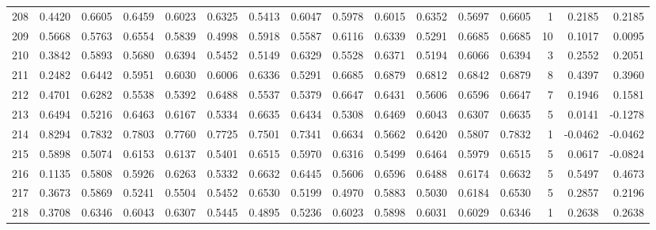 \begin{tabular}{lrrrrrrrrrrrrrrr}
208 &      0.4420 &  0.6605 &  0.6459 &  0.6023 &  0.6325 &  0.5413 &  0.6047 &  0.5978 &  0.6015 &  0.6352 &   0.5697 &     0.6605 &      1 &                    0.2185 &                     0.2185 \\
209 &      0.5668 &  0.5763 &  0.6554 &  0.5839 &  0.4998 &  0.5918 &  0.5587 &  0.6116 &  0.6339 &  0.5291 &   0.6685 &     0.6685 &     10 &                    0.1017 &                     0.0095 \\
210 &      0.3842 &  0.5893 &  0.5680 &  0.6394 &  0.5452 &  0.5149 &  0.6329 &  0.5528 &  0.6371 &  0.5194 &   0.6066 &     0.6394 &      3 &                    0.2552 &                     0.2051 \\
211 &      0.2482 &  0.6442 &  0.5951 &  0.6030 &  0.6006 &  0.6336 &  0.5291 &  0.6685 &  0.6879 &  0.6812 &   0.6842 &     0.6879 &      8 &                    0.4397 &                     0.3960 \\
212 &      0.4701 &  0.6282 &  0.5538 &  0.5392 &  0.6488 &  0.5537 &  0.5379 &  0.6647 &  0.6431 &  0.5606 &   0.6596 &     0.6647 &      7 &                    0.1946 &                     0.1581 \\
213 &      0.6494 &  0.5216 &  0.6463 &  0.6167 &  0.5334 &  0.6635 &  0.6434 &  0.5308 &  0.6469 &  0.6043 &   0.6307 &     0.6635 &      5 &                    0.0141 &                    -0.1278 \\
214 &      0.8294 &  0.7832 &  0.7803 &  0.7760 &  0.7725 &  0.7501 &  0.7341 &  0.6634 &  0.5662 &  0.6420 &   0.5807 &     0.7832 &      1 &                   -0.0462 &                    -0.0462 \\
215 &      0.5898 &  0.5074 &  0.6153 &  0.6137 &  0.5401 &  0.6515 &  0.5970 &  0.6316 &  0.5499 &  0.6464 &   0.5979 &     0.6515 &      5 &                    0.0617 &                    -0.0824 \\
216 &      0.1135 &  0.5808 &  0.5926 &  0.6263 &  0.5332 &  0.6632 &  0.6445 &  0.5606 &  0.6596 &  0.6488 &   0.6174 &     0.6632 &      5 &                    0.5497 &                     0.4673 \\
217 &      0.3673 &  0.5869 &  0.5241 &  0.5504 &  0.5452 &  0.6530 &  0.5199 &  0.4970 &  0.5883 &  0.5030 &   0.6184 &     0.6530 &      5 &                    0.2857 &                     0.2196 \\
218 &      0.3708 &  0.6346 &  0.6043 &  0.6307 &  0.5445 &  0.4895 &  0.5236 &  0.6023 &  0.5898 &  0.6031 &   0.6029 &     0.6346 &      1 &                    0.2638 &                     0.2638 \\

\end{tabular}
